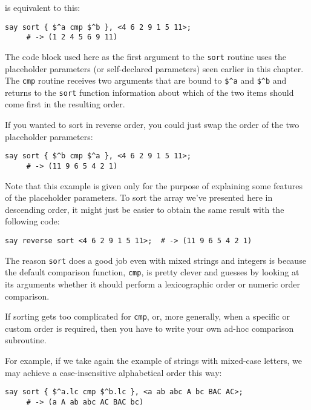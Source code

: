 is equivalent to this:

\begin{verbatim}
say sort { $^a cmp $^b }, <4 6 2 9 1 5 11>;
     # -> (1 2 4 5 6 9 11)
\end{verbatim}

The code block used here as the first argument to the 
{\tt sort} routine uses the placeholder 
parameters (or self-declared parameters) seen earlier 
in this chapter. The {\tt cmp} routine receives two 
arguments that are bound to \verb'$^a' and \verb'$^b' 
and returns to the \verb'sort' function information 
about which of the two items should come first in the 
resulting order.

If you wanted to sort in reverse order, you could just 
swap the order of the two placeholder parameters:

\begin{verbatim}
say sort { $^b cmp $^a }, <4 6 2 9 1 5 11>;
     # -> (11 9 6 5 4 2 1)
\end{verbatim}

Note that this example is given only for the purpose of 
explaining some features of the placeholder parameters. 
To sort the array we've presented here in descending order, 
it might just be easier to obtain the same result with the 
following code:

\begin{verbatim}
say reverse sort <4 6 2 9 1 5 11>;  # -> (11 9 6 5 4 2 1)
\end{verbatim}

The reason {\tt sort} does a good job even with mixed 
strings and integers is because the default comparison 
function, {\tt cmp}, is pretty clever and guesses by 
looking at its arguments whether it should perform 
a lexicographic order or numeric order comparison.

If sorting gets too complicated for {\tt cmp}, or, more 
generally, when a specific or custom order is required, 
then you have to write your own ad-hoc comparison 
subroutine.

For example, if we take again the example of strings 
with mixed-case letters, we may achieve a case-insensitive 
alphabetical order this way:

\begin{verbatim}
say sort { $^a.lc cmp $^b.lc }, <a ab abc A bc BAC AC>;
     # -> (a A ab abc AC BAC bc)
\end{verbatim}

